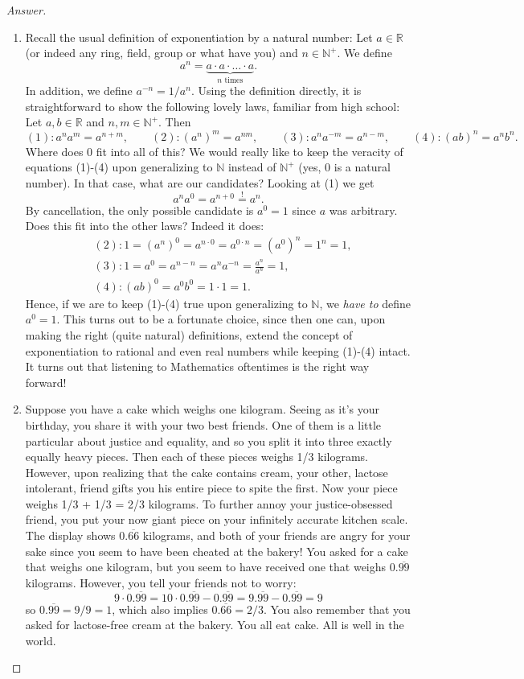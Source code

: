 \begin{proof}[Answer]
\begin{enumerate}[wide]
\item Recall the usual definition of exponentiation by a natural number: Let $a \in \mathbb{R}$ (or indeed any ring, field, group or what have you) and $n \in \mathbb{N}^+$. We define
\[
a^n = \underbrace{a\cdot a \cdot \ldots \cdot a}_\text{$n$ times}.
\]
In addition, we define $a^{-n} = 1/a^n$. Using the definition directly, it is straightforward to show the following lovely laws, familiar from high school: Let $a, b \in \mathbb{R}$ and $n, m \in \mathbb{N}^+$. Then
\[
(1): a^n a^m = a^{n+m}, \qquad (2): (a^n)^m = a^{nm}, \qquad (3): a^{n}a^{-m} = a^{n-m}, \qquad (4): (ab)^n = a^nb^n.
\]
Where does 0 fit into all of this? We would really like to keep the veracity of equations (1)-(4) upon generalizing to $\mathbb{N}$ instead of $\mathbb{N}^+$ (yes, 0 is a natural number). In that case, what are our candidates? Looking at (1) we get
\[
a^n a^0 = a^{n+0} \overset{!}{=} a^n.
\]
By cancellation, the only possible candidate is $a^0 = 1$ since $a$ was arbitrary. Does this fit into the other laws? Indeed it does:
\[
\begin{aligned}
&(2): 1 = (a^n)^0 = a^{n\cdot 0} = a^{0\cdot n} = (a^0)^n = 1^n = 1, \\
&(3): 1 = a^0 = a^{n-n} = a^n a^{-n} = \frac{a^n}{a^n} = 1, \\
&(4): (ab)^0 = a^0b^0 = 1\cdot 1 = 1.
\end{aligned}
\]
Hence, if we are to keep (1)-(4) true upon generalizing to $\mathbb{N}$, we \textit{have to} define $a^0 = 1$. This turns out to be a fortunate choice, since then one can, upon making the right (quite natural) definitions, extend the concept of exponentiation to rational and even real numbers while keeping (1)-(4) intact. It turns out that listening to Mathematics oftentimes is the right way forward!

\item Suppose you have a cake which weighs one kilogram. Seeing as it's your birthday, you share it with your two best friends. One of them is a little particular about justice and equality, and so you split it into three exactly equally heavy pieces. Then each of these pieces weighs 1/3 kilograms. However, upon realizing that the cake contains cream, your other, lactose intolerant, friend gifts you his entire piece to spite the first. Now your piece weighs 1/3 + 1/3 = 2/3 kilograms. To further annoy your justice-obsessed friend, you put your now giant piece on your infinitely accurate kitchen scale. The display shows $0.\overline{66}$ kilograms, and both of your friends are angry for your sake since you seem to have been cheated at the bakery! You asked for a cake that weighs one kilogram, but you seem to have received one that weighs $0.\overline{99}$ kilograms. However, you tell your friends not to worry:
\[
9\cdot 0.\overline{99} = 10\cdot 0.\overline{99} - 0.\overline{99} = 9.\overline{99} - 0.\overline{99} = 9
\]
so $0.\overline{99} = 9/9 = 1$, which also implies $0.\overline{66} = 2/3$. You also remember that you asked for lactose-free cream at the bakery. You all eat cake. All is well in the world.


\end{enumerate}
\end{proof}
